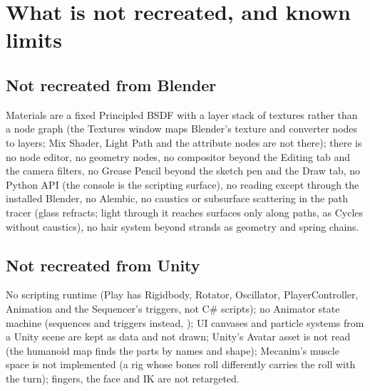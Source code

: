 \chapter{What is not recreated, and known limits}
\label{ch:scope}

\section{Not recreated from Blender}
Materials are a fixed Principled BSDF with a layer stack of textures rather than a node graph (the Textures window maps
Blender's texture and converter nodes to layers; Mix Shader, Light Path and the attribute nodes are not there); there is
no node editor, no geometry nodes, no compositor beyond the Editing tab and the camera filters, no Grease Pencil beyond
the sketch pen and the Draw tab, no Python API (the console is the scripting surface), no  reading except
through the installed Blender, no Alembic, no caustics or subsurface scattering in the path tracer (glass refracts;
light through it reaches surfaces only along paths, as Cycles without caustics), no hair system beyond strands as
geometry and spring chains.

\section{Not recreated from Unity}
No scripting runtime (Play has Rigidbody, Rotator, Oscillator, PlayerController, Animation and the Sequencer's
triggers, not C\# scripts); no Animator state machine (sequences and triggers instead, ); UI canvases and
particle systems from a Unity scene are kept as data and not drawn; Unity's Avatar asset is not read (the humanoid map
finds the parts by names and shape); Mecanim's muscle space is not implemented (a rig whose bones roll differently
carries the roll with the turn); fingers, the face and IK are not retargeted.

